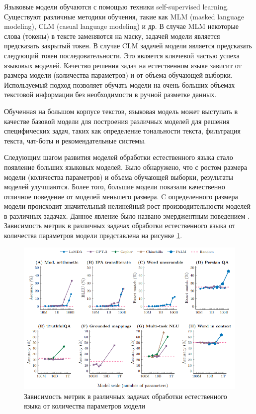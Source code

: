 Языковые модели обучаются с помощью техники self-supervised learning. Существуют различные методики обучения, такие как MLM (masked language modeling), CLM (casual language modeling) и др. В случае MLM некоторые слова (токены) в тексте заменяются на маску, задачей модели является предсказать закрытый токен. В случае CLM задачей модели является предсказать следующий токен последовательности. Это является ключевой частью успеха языковых моделей. Качество решения задач на естественном языке зависит от размера модели (количества параметров) и от объема обучающей выборки. Используемый подход позволяет обучать модели на очень больших объемах текстовой информации без необходимости в ручной разметке данных.

Обученная на большом корпусе текстов, языковая модель может выступать в качестве базовой модели для построения различных моделей для решения специфических задач, таких как определение тональности текста, фильтрация текста, чат-боты и рекомендательные системы.

Следующим шагом развития моделей обработки естественного языка стало появление больших языковых моделей. Было обнаружено, что с ростом размера модели (количества параметров) и объема обучающей выборки, результаты моделей улучшаются. Более того, большие модели показали качественно отличное поведение от моделей меньшего размера. C определенного размера модели происходит значительный нелинейный рост производительности моделей в различных задачах. Данное явление было названо эмерджентным поведением \cite{llm_emergent}. Зависимость метрик в различных задачах обработки естественного языка от количества параметров модели представлена на рисунке \ref{img:llm_scaling}.

\begin{figure}[h]
    \centering
    \includegraphics[width=\linewidth]{../images/llm_scaling.png}
    \caption{Зависимость метрик в различных задачах обработки естественного языка от количества параметров модели \cite{llm_emergent}}
    \label{img:llm_scaling}
\end{figure}


